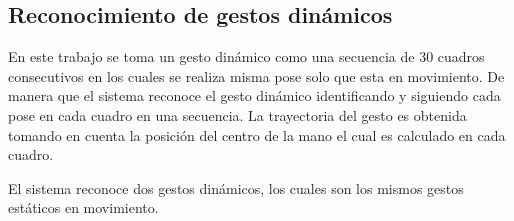 \subsection{Reconocimiento de gestos dinámicos}\label{RecognitionDynamic}


En este trabajo se toma un gesto dinámico como una secuencia de $30$ cuadros consecutivos en los cuales se realiza misma pose solo que esta en movimiento. De manera que el sistema reconoce el gesto dinámico identificando y siguiendo cada pose en cada cuadro en una secuencia. La trayectoria del gesto es obtenida tomando en cuenta la posición del centro de la mano el cual es calculado en cada cuadro. 
 
El sistema reconoce dos gestos dinámicos, los cuales son los mismos gestos estáticos en movimiento.
\begin{figure}[h!]
\begin{center}

\end{center}
\end{figure}
